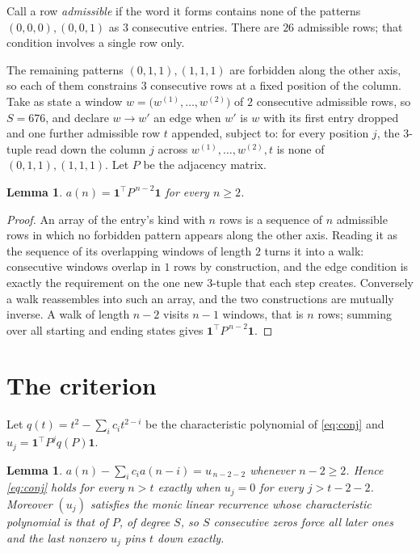 \documentclass[11pt,a4paper]{article}
\theoremstyle{plain}
\newtheorem{lemma}[theorem]{Lemma}
\theoremstyle{definition}
\begin{document}
Call a row \emph{admissible} if the word it forms contains none of the patterns
$(0,0,0), (0,0,1)$ as $3$ consecutive entries. There are $26$ admissible rows; that condition
involves a single row only.

The remaining patterns $(0,1,1), (1,1,1)$ are forbidden along the other axis, so each of them
constrains $3$ consecutive rows at a fixed position of the column. Take as state a
window $w=\bigl(w^{(1)},\dots,w^{(2)}\bigr)$ of $2$ consecutive admissible
rows, so $S=676$, and declare $w\to w'$ an edge when $w'$ is $w$ with its first entry
dropped and one further admissible row $t$ appended, subject to: for every position
$j$, the $3$-tuple read down the column $j$ across $w^{(1)},\dots,w^{(2)},t$
is none of $(0,1,1), (1,1,1)$. Let $P$ be the adjacency matrix.

\begin{lemma}\label{lem:walk}
$a(n)=\mathbf{1}^{\!\top}P^{\,n-2}\mathbf{1}$ for every $n\ge2$.
\end{lemma}

\begin{proof}
An array of the entry's kind with $n$ rows is a sequence of $n$ admissible rows in
which no forbidden pattern appears along the other axis. Reading it as the sequence of its
overlapping windows of length $2$ turns it into a walk: consecutive windows overlap in
$1$ rows by construction, and the edge condition is exactly the requirement on the one
new $3$-tuple that each step creates. Conversely a walk reassembles into such an array,
and the two constructions are mutually inverse. A walk of length $n-2$ visits $n-1$
windows, that is $n$ rows; summing over all starting and ending states gives
$\mathbf{1}^{\!\top}P^{\,n-2}\mathbf{1}$.
\end{proof}

\section{The criterion}

Let $q(t)=t^{2}-\sum_i c_i t^{2-i}$ be the characteristic polynomial of
\eqref{eq:conj} and $u_j=\mathbf{1}^{\!\top}P^{j}q(P)\mathbf{1}$.

\begin{lemma}\label{lem:crit}
$a(n)-\sum_i c_i a(n-i)=u_{\,n-2-2}$ whenever $n-2\ge2$. Hence
\eqref{eq:conj} holds for every $n>t$ exactly when $u_j=0$ for every
$j>t-2-2$. Moreover $(u_j)$ satisfies the monic linear recurrence whose
characteristic polynomial is that of $P$, of degree $S$, so $S$ consecutive zeros force all
later ones and the last nonzero $u_j$ pins $t$ down exactly.
\end{lemma}
\end{document}
